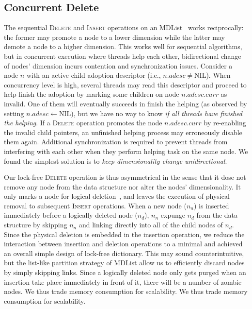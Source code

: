 \documentclass[10pt,conference,compsocconf]{IEEEtran}
\newcommand\NIL{\text{NIL}}
\begin{document}
\subsection{Concurrent Delete}
\label{sec:cpqueuedel}
The sequential \textsc{Delete} and \textsc{Insert} operations on an MDList~\cite{zhang2015lockfree} works reciprocally: the former may promote a node to a lower dimension while the latter may demote a node to a higher dimension.
This works well for sequential algorithms, but in concurrent execution where threads help each other, bidirectional change of nodes' dimension incurs contention and synchronization issues.
Consider a node $n$ with an active child adoption descriptor (i.e., $n.adesc\neq\NIL$).
When concurrency level is high, several threads may read this descriptor and proceed to help finish the adoption by marking some children on node $n.adesc.curr$ as invalid.
One of them will eventually succeeds in finish the helping (as observed by setting $n.adesc\gets \NIL$), but we have no way to know \emph{if all threads have finished the helping}.
If a \textsc{Delete} operation promotes the node $n.adesc.curr$ by re-enabling the invalid child pointers, an unfinished helping process may erroneously disable them again.
Additional synchronization is required to prevent threads from interfering with each other when they perform helping task on the same node.
We found the simplest solution is to \emph{keep dimensionality change unidirectional}.

Our lock-free \textsc{Delete} operation is thus asymmetrical in the sense that it dose not remove any node from the data structure nor alter the nodes' dimensionality.
It only marks a node for logical deletion~\cite{harris2001pragmatic}, and leaves the execution of physical removal to subsequent \textsc{Insert} operations.
When a new node ($n_n$) is inserted immediately before a logically deleted node ($n_d$), $n_n$ expunge $n_d$ from the data structure by skipping $n_n$ and linking directly into all of the child nodes of $n_d$.
Since the physical deletion is embedded in the insertion operation, we reduce the interaction between insertion and deletion operations to a minimal and achieved an overall simple design of lock-free dictionary.
This may sound counterintuitive, but the list-like partition strategy of MDList allow us to efficiently discard nodes by simply skipping links. 
Since a logically deleted node only gets purged when an insertion take place immediately in front of it, there will be a number of zombie nodes.
We thus trade memory consumption for scalability.
We thus trade memory consumption for scalability.
\end{document}
